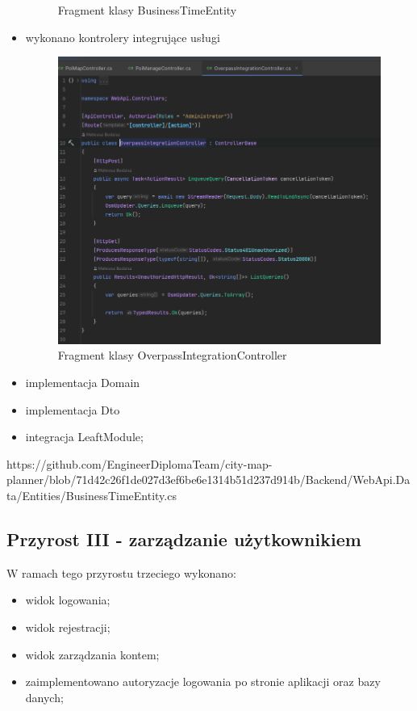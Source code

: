 \begin{itemize}
\begin{figure}[H]
            \caption{Fragment klasy BusinessTimeEntity}
            \label{fig:figure}
            \end{figure}
        \item wykonano kontrolery integrujące usługi
        \begin{figure}[H]
            \centering
            \includegraphics[width=1\textwidth]{attachments/OverpassIntegrationController}
            \caption{Fragment klasy OverpassIntegrationController}
            \label{fig:figure}
            \end{figure}
        \item implementacja Domain
        
        \item implementacja Dto
        \item integracja LeaftModule;

    \end{itemize}

    https://github.com/EngineerDiplomaTeam/city-map-planner/blob/71d42c26f1de027d3ef6be6e1314b51d237d914b/Backend/WebApi.Data/Entities/BusinessTimeEntity.cs

    \subsection{Przyrost III - zarządzanie użytkownikiem}
    \label{sec:przyrost3}

    W ramach tego przyrostu trzeciego wykonano:
    \begin{itemize}
        \item widok logowania;
        \item widok rejestracji;
        \item widok zarządzania kontem;
        \item zaimplementowano autoryzacje logowania po stronie aplikacji oraz bazy danych;
    \end{itemize}

